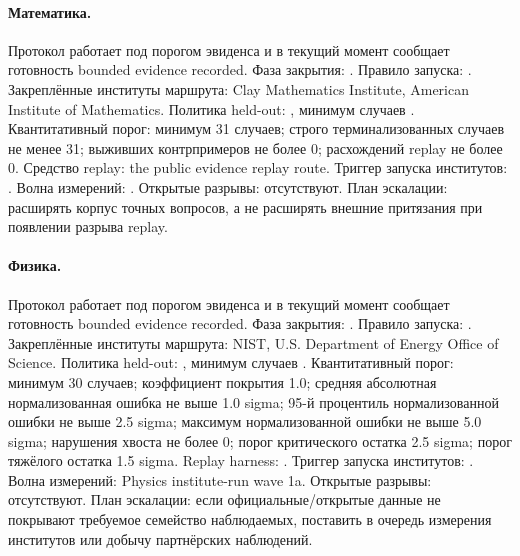 \paragraph{Математика.}
Протокол  работает под порогом эвиденса  и в текущий момент сообщает готовность bounded evidence recorded.
Фаза закрытия: . Правило запуска: .
Закреплённые институты маршрута: Clay Mathematics Institute, \allowbreak American Institute of Mathematics.
Политика held-out: , минимум случаев .
Квантитативный порог: минимум 31 случаев; строго терминализованных случаев не менее 31; выживших контрпримеров не более 0; расхождений replay не более 0.
Средство replay: the public evidence replay route.
Триггер запуска институтов: . Волна измерений: .
Открытые разрывы: отсутствуют.
План эскалации: расширять корпус точных вопросов, а не расширять внешние притязания при появлении разрыва replay.

\paragraph{Физика.}
Протокол  работает под порогом эвиденса  и в текущий момент сообщает готовность bounded evidence recorded.
Фаза закрытия: . Правило запуска: .
Закреплённые институты маршрута: NIST, \allowbreak U.S. Department of Energy Office of Science.
Политика held-out: , минимум случаев .
Квантитативный порог: минимум 30 случаев; коэффициент покрытия 1.0; средняя абсолютная нормализованная ошибка не выше 1.0 sigma; 95-й процентиль нормализованной ошибки не выше 2.5 sigma; максимум нормализованной ошибки не выше 5.0 sigma; нарушения хвоста не более 0; порог критического остатка 2.5 sigma; порог тяжёлого остатка 1.5 sigma.
Replay harness: .
Триггер запуска институтов: . Волна измерений: Physics institute-run wave 1a.
Открытые разрывы: отсутствуют.
План эскалации: если официальные/открытые данные не покрывают требуемое семейство наблюдаемых, поставить в очередь измерения институтов или добычу партнёрских наблюдений.


